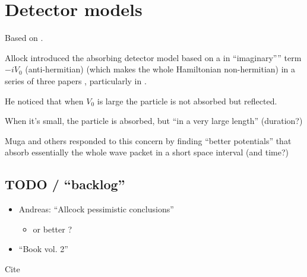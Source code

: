 \section{Detector models}

Based on \cite[Sec. 1.4.3]{TQM1}.

Allock introduced the absorbing detector model based on a in ``imaginary'''' term $-iV_0$
(anti-hermitian) (which makes the whole Hamiltonian non-hermitian) in a series of three papers
\parencite{Allcock-1, Allcock-2, Allcock-3},
particularly in \cite[Sec. 2-4]{Allcock-2}.

He noticed that when $V_0$ is large the particle is not absorbed but reflected.

When it's small, the particle is absorbed, but ``in a very large length'' (duration?)

Muga and others responded to this concern by finding ``better potentials'' that absorb essentially the
whole wave packet in a short space interval (and time?)
\parencite{Muga_TOAQM}

\subsection{TODO / ``backlog''}

\begin{itemize}
  \item Andreas: ``Allcock pessimistic conclusions''
  \begin{itemize}
    \item \cite[3, 6]{Leavens_TOA} or better \cite{Leavens_backflow} ?
  \end{itemize}

  \item ``Book vol. 2'' \cite[Ch. 4]{TQM2}
\end{itemize}

Cite \cite{
  Muga_ArrTimeOpNormal, Damborenea,
  Sudarshan_Zeno,
  Echanobe,
  Savvidou-1, Savvidou-2,
  ComplexAbsPot,
}
